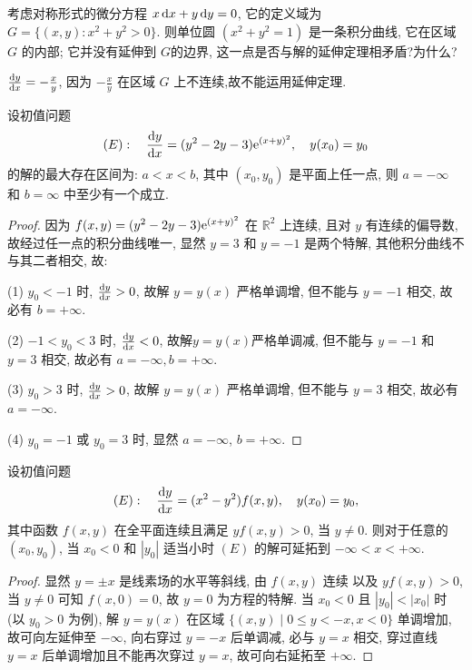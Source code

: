 \begin{exercise}
  考虑对称形式的微分方程 $x\mathop{}\!\mathrm{d} x+y\mathop{}\!\mathrm{d} y=0$,
  它的定义域为 $G=\{(x,y):x^2+y^2>0\}$. 则单位圆 $(x^2+y^2=1)$ 是一条积分曲线,
  它在区域 $G$ 的内部; 它并没有延伸到 $G$的边界, 这一点是否与解的延伸定理相矛盾?为什么?
\end{exercise}

\begin{solution}
  $\frac{\mathop{}\!\mathrm{d} y}{\mathop{}\!\mathrm{d} x}=-\frac{x}{y}$, 因为 $-\frac{x}{y}$ 在区域 $G$ 上不连续,故不能运用延伸定理.
\end{solution}



\begin{exercise}
  设初值问题
  \[(E):\quad \frac{\mathop{}\!\mathrm{d} y}{\mathop{}\!\mathrm{d} x}=(y^2-2y-3)\mathrm{e}^{(x+y)^2},\quad y(x_0)=y_0\]
  的解的最大存在区间为: $a<x<b$, 其中 $(x_0,y_0)$ 是平面上任一点,
  则 $a=-\infty$ 和 $b=\infty$ 中至少有一个成立.
\end{exercise}

\begin{proof}
  因为 $f(x,y)=(y^2-2y-3)\mathrm{e}^{(x+y)^2}$ 在 $\mathbb{R}^2$ 上连续,
  且对 $y$ 有连续的偏导数, 故经过任一点的积分曲线唯一, 显然 $y=3$ 和 $y=-1$ 是两个特解,
  其他积分曲线不与其二者相交, 故:

  (1) $y_0<-1$ 时, $\frac{\mathop{}\!\mathrm{d} y}{\mathop{}\!\mathrm{d} x}>0$, 故解 $y=y(x)$ 严格单调增, 
  但不能与 $y=-1$ 相交, 故必有 $b=+\infty$.

  (2) $-1<y_0<3$ 时, $\frac{\mathop{}\!\mathrm{d} y}{\mathop{}\!\mathrm{d} x}<0$, 故解$y=y(x)$严格单调减,
  但不能与 $y=-1$ 和 $y=3$ 相交, 故必有 $a=-\infty,b=+\infty$.

  (3) $y_0>3$ 时, $\frac{\mathop{}\!\mathrm{d} y}{\mathop{}\!\mathrm{d} x}>0$, 故解 $y=y(x)$ 严格单调增,
  但不能与 $y=3$ 相交, 故必有 $a=-\infty$.

  (4) $y_0 = -1$ 或 $y_0 = 3$ 时, 显然 $a=-\infty$, $b=+\infty$.
\end{proof}



\begin{exercise}
  设初值问题
  \[(E):\quad \frac{\mathop{}\!\mathrm{d} y}{\mathop{}\!\mathrm{d} x}=(x^2-y^2)f(x,y),\quad y(x_0)=y_0,\]
  其中函数 $f(x,y)$ 在全平面连续且满足 $yf(x,y)>0$, 当 $y\neq 0$.
  则对于任意的 $(x_0,y_0)$,
  当 $x_0<0$ 和 $|y_0|$ 适当小时 $(E)$ 的解可延拓到 $-\infty<x<+\infty$.
\end{exercise}

\begin{proof}
  显然 $y=\pm x$ 是线素场的水平等斜线, 由 $f(x,y)$ 连续
  以及 $yf(x,y)>0$, 当 $y\neq 0$ 可知 $f(x,0)=0$,
  故 $y=0$ 为方程的特解. 当 $x_0<0$ 且 $|y_0|<|x_0|$ 时 (以 $y_0>0$ 为例),
  解 $y=y(x)$ 在区域 $\{(x,y)\mid 0\leq y<-x,x<0\}$ 单调增加, 故可向左延伸至 $-\infty$,
  向右穿过 $y=-x$ 后单调减, 必与 $y=x$ 相交, 
  穿过直线 $y=x$ 后单调增加且不能再次穿过 $y=x$, 故可向右延拓至 $+\infty$.
\end{proof}



